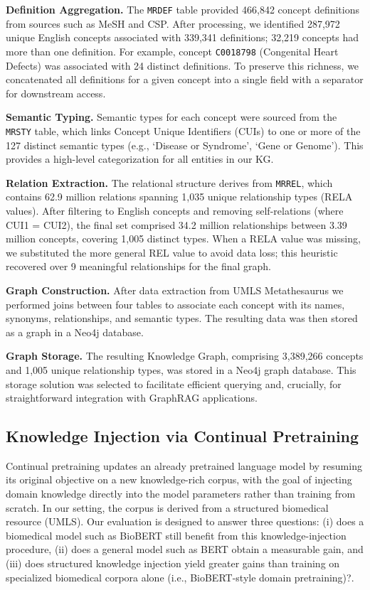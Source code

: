 \documentclass[10pt, a4paper]{article}
\begin{document}
\noindent\textbf{Definition Aggregation.} The \texttt{MRDEF} table provided 466,842 concept definitions from sources such as MeSH and CSP. After processing, we identified 287,972 unique English concepts associated with 339,341 definitions; 32,219 concepts had more than one definition. For example, concept \texttt{C0018798} (Congenital Heart Defects) was associated with 24 distinct definitions. To preserve this richness, we concatenated all definitions for a given concept into a single field with a separator for downstream access.

\noindent\textbf{Semantic Typing.} Semantic types for each concept were sourced from the \texttt{MRSTY} table, which links Concept Unique Identifiers (CUIs) to one or more of the 127 distinct semantic types (e.g., `Disease or Syndrome', `Gene or Genome'). This provides a high-level categorization for all entities in our KG.

\noindent\textbf{Relation Extraction.} The relational structure derives from \texttt{MRREL}, which contains 62.9 million relations spanning 1,035 unique relationship types (RELA values). After filtering to English concepts and removing self-relations (where CUI1 = CUI2), the final set comprised 34.2 million relationships between 3.39 million concepts, covering 1,005 distinct types. When a RELA value was missing, we substituted the more general REL value to avoid data loss; this heuristic recovered over 9 meaningful relationships for the final graph.

\noindent\textbf{Graph Construction.} After data extraction from UMLS Metathesaurus we performed joins between four tables to associate each concept with its names, synonyms, relationships, and semantic types.
The resulting data was then stored as a graph in a Neo4j database.

\noindent\textbf{Graph Storage.} The resulting Knowledge Graph, comprising 3,389,266 concepts and 1,005 unique relationship types, was stored in a Neo4j graph database. This storage solution was selected to facilitate efficient querying and, crucially, for straightforward integration with GraphRAG applications. 
\subsection{Knowledge Injection via Continual Pretraining }
Continual pretraining updates an already pretrained language model by resuming its original objective on a new knowledge-rich corpus, with the goal of injecting domain knowledge directly into the model parameters rather than training from scratch. In our setting, the corpus is derived from a structured biomedical resource (UMLS). Our evaluation is designed to answer three questions: (i) does a biomedical model such as BioBERT still benefit from this knowledge-injection procedure, (ii) does a general model such as BERT obtain a measurable gain, and (iii) does structured knowledge injection yield greater gains than training on specialized biomedical corpora alone (i.e., BioBERT-style domain pretraining)?.
\end{document}
